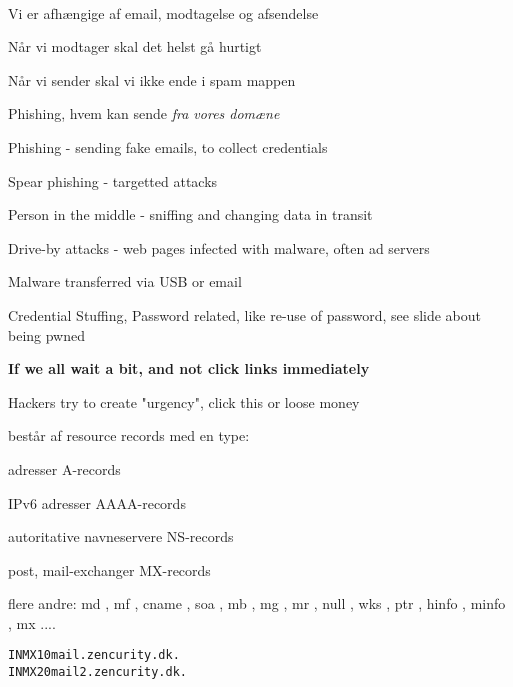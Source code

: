 \documentclass[Screen16to9,17pt]{foils}
\begin{document}

{~}

\begin{list2}
\item Vi er afhængige af email, modtagelse og afsendelse
\item Når vi modtager skal det helst gå hurtigt
\item Når vi sender skal vi ikke ende i spam mappen
\item Phishing, hvem kan sende \emph{fra vores domæne}
\end{list2}



\begin{list2}
\item Phishing - sending fake emails, to collect credentials
\item Spear phishing - targetted attacks
\item Person in the middle - sniffing and changing data in transit
\item Drive-by attacks - web pages infected with malware, often ad servers
\item Malware transferred via USB or email
\item Credential Stuffing, Password related, like re-use of password, see slide about being pwned
\end{list2}

\vskip 1cm
\centerline{\Large\bf If we all wait a bit, and not click links immediately}

\vskip 1cm
Hackers try to create "urgency", click this or loose money


\begin{list1}
  \item består af resource records med en type:
    \begin{list2}
\item adresser A-records
\item IPv6 adresser AAAA-records
\item autoritative navneservere NS-records
\item post, mail-exchanger MX-records
\item flere andre: md ,  mf ,  cname ,  soa ,
                  mb , mg ,  mr ,  null ,  wks ,  ptr ,
                  hinfo ,  minfo ,  mx ....
\end{list2}
\end{list1}
\begin{alltt}
        IN      MX      10      mail.zencurity.dk.
        IN      MX      20      mail2.zencurity.dk.
\end{alltt}
\end{document}
